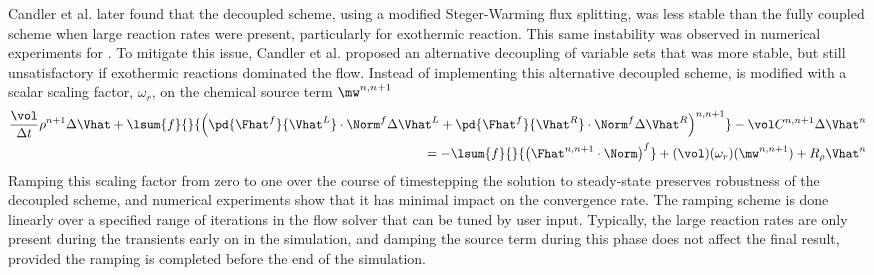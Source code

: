 Candler et al.\cite{candler2013analysis} later found that the decoupled scheme,
using a modified Steger-Warming flux splitting, was less stable than the fully
coupled scheme when large reaction rates were present, particularly for
exothermic reaction.  This same instability was observed in numerical
experiments for .  To mitigate this issue, Candler et
al. proposed an alternative decoupling of variable sets that was more stable,
but still unsatisfactory if exothermic reactions dominated the flow.  Instead of
implementing this alternative decoupled scheme,  is
modified with a scalar scaling factor, $\omega_r$, on the chemical source term
$\mw^{n,n+1}$
\begin{equation} 
  \begin{split}
    \frac{\vol}{\Delta t} \rho^{n+1} \Delta\Vhat + 
    \lsum{f}{}{ \left( 
      \pd{\Fhat^f}{\Vhat^L} \cdot \Norm^f \Delta \Vhat^L 
    + \pd{\Fhat^f}{\Vhat^R} \cdot \Norm^f \Delta \Vhat^R 
    \right)^{n,n+1}} 
    - \vol C^{n,n+1} \Delta \Vhat^n \\ 
    = -\lsum{f}{}{
      \left( \Fhat^{n,n+1} \cdot \Norm \right)^f 
    } 
    + (\vol)(\omega_r)(\mw^{n, n+1}) + R_\rho \Vhat^n
  \end{split}
  \label{decoupled-with-scaling}
\end{equation}
Ramping this scaling factor from zero to one over the course of timestepping the
solution to steady-state preserves robustness of the decoupled scheme, and
numerical experiments show that it has minimal impact on the convergence rate.
The ramping scheme is done linearly over a specified range of iterations in the
flow solver that can be tuned by user input.  Typically, the large reaction
rates are only present during the transients early on in the simulation, and
damping the source term during this phase does not affect the final result,
provided the ramping is completed before the end of the simulation.

